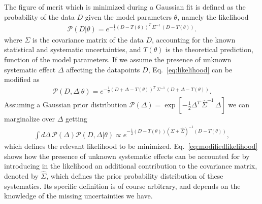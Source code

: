 %
The figure of merit which is minimized during a Gaussian fit is defined as the probability of the data $D$ given
the model parameters $\theta$, namely the likelihood
\begin{align}
    \label{eq:likelihood}
    \mathcal{P}\left(D|\theta\right) = e^{-\frac{1}{2}\left(D-T\left(\theta\right)\right)^T\,
    \Sigma^{-1}\,\left(D-T\left(\theta\right)\right)}.
\end{align}
where $\Sigma$ is the covariance matrix of the data $D$, accounting for the known
statistical and systematic uncertainties, and $T\left(\theta\right)$ is the theoretical prediction,
function of the model parameters.
If we assume the presence of unknown systematic effect $\Delta$ affecting the datapoints $D$, Eq.~\eqref{eq:likelihood}
can be modified as
\begin{align}
    \mathcal{P}\left(D,\Delta|\theta\right) = 
    e^{-\frac{1}{2}\left(D+\Delta-T\left(\theta\right)\right)^T\,
    \Sigma^{-1}\,\left(D+\Delta-T\left(\theta\right)\right)}.
\end{align}
Assuming a Gaussian prior distribution 
$\mathcal{P}\left(\Delta\right) = \exp\left[-\frac{1}{2}\Delta^T\,\hat{\Sigma}^{-1}\,\Delta\right]$
we can marginalize over $\Delta$ getting
\begin{align}
    \label{eq:modifiedlikelihood}
    \int d\Delta\,\mathcal{P}\left(\Delta\right) \mathcal{P}\left(D,\Delta|\theta\right)   
    \propto 
    e^{-\frac{1}{2}\left(D-T\left(\theta\right)\right)\left(\Sigma+\hat{\Sigma}\right)^{-1}\left(D-T\left(\theta\right)\right)},
\end{align}
which defines the relevant likelihood to be minimized.
Eq.~\eqref{eq:modifiedlikelihood} shows how the presence of unknown systematic effects can be accounted for by 
introducing in the likelihood an additional contribution to the covariance matrix, denoted by $\hat{\Sigma}$, 
which defines the prior probability distribution of these systematics. Its specific definition is of course arbitrary,
and depends on the knowledge of the missing uncertainties we have.

